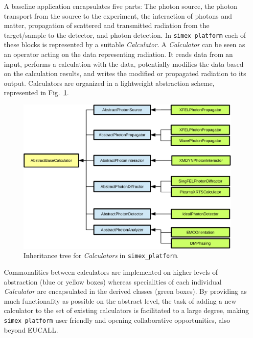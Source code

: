 \documentclass[12pt]{scrartcl}
\begin{document}
A baseline application encapsulates five parts:
The photon source, the photon transport from the source to the
experiment, the interaction of photons and matter, propagation of scattered and
transmitted radiation from the target/sample to the detector, and photon
detection. In \texttt{simex\_platform}
each of these blocks is represented by a suitable \textit{Calculator}. A
\textit{Calculator} can be seen as an operator acting on the data representing
radiation. It reads data from an input, performs a calculation with the data,
potentially modifies the data based on the calculation results, and  writes the
modified or propagated radiation to its output. Calculators are organized in a
lightweight abstraction scheme, represented in Fig.~\ref{fig:simex_calculators_tree}.
\begin{figure}[ht]
  \begin{center}
    \includegraphics[width=1.0\textwidth,angle=0,clip]{calculators_inheritance-crop}
  \end{center}
  \caption{Inheritance tree for \textit{Calculators} in \texttt{simex\_platform}.}
  \label{fig:simex_calculators_tree}
\end{figure}

Commonalities between calculators are implemented on higher levels of
abstraction (blue or yellow boxes) whereas
specialities of each individual \textit{Calculator} are encapsulated in the
derived classes (green boxes). By providing as much functionality as possible on
the abstract level, the task of adding a new calculator to the set of existing
calculators is facilitated to a large degree, making \texttt{simex\_platform}
user friendly and opening collaborative opportunities, also beyond EUCALL.
\end{document}
